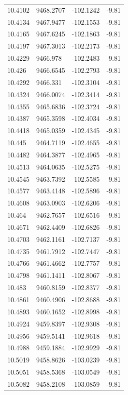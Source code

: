 \begin{table}[H]
\begin{tabular}{llll}
10.4102 & 9468.2707 & -102.1242 & -9.81 \\
10.4134 & 9467.9477 & -102.1553 & -9.81 \\
10.4165 & 9467.6245 & -102.1863 & -9.81 \\
10.4197 & 9467.3013 & -102.2173 & -9.81 \\
10.4229 & 9466.978 & -102.2483 & -9.81 \\
10.426 & 9466.6545 & -102.2793 & -9.81 \\
10.4292 & 9466.331 & -102.3104 & -9.81 \\
10.4324 & 9466.0074 & -102.3414 & -9.81 \\
10.4355 & 9465.6836 & -102.3724 & -9.81 \\
10.4387 & 9465.3598 & -102.4034 & -9.81 \\
10.4418 & 9465.0359 & -102.4345 & -9.81 \\
10.445 & 9464.7119 & -102.4655 & -9.81 \\
10.4482 & 9464.3877 & -102.4965 & -9.81 \\
10.4513 & 9464.0635 & -102.5275 & -9.81 \\
10.4545 & 9463.7392 & -102.5585 & -9.81 \\
10.4577 & 9463.4148 & -102.5896 & -9.81 \\
10.4608 & 9463.0903 & -102.6206 & -9.81 \\
10.464 & 9462.7657 & -102.6516 & -9.81 \\
10.4671 & 9462.4409 & -102.6826 & -9.81 \\
10.4703 & 9462.1161 & -102.7137 & -9.81 \\
10.4735 & 9461.7912 & -102.7447 & -9.81 \\
10.4766 & 9461.4662 & -102.7757 & -9.81 \\
10.4798 & 9461.1411 & -102.8067 & -9.81 \\
10.483 & 9460.8159 & -102.8377 & -9.81 \\
10.4861 & 9460.4906 & -102.8688 & -9.81 \\
10.4893 & 9460.1652 & -102.8998 & -9.81 \\
10.4924 & 9459.8397 & -102.9308 & -9.81 \\
10.4956 & 9459.5141 & -102.9618 & -9.81 \\
10.4988 & 9459.1884 & -102.9929 & -9.81 \\
10.5019 & 9458.8626 & -103.0239 & -9.81 \\
10.5051 & 9458.5368 & -103.0549 & -9.81 \\
10.5082 & 9458.2108 & -103.0859 & -9.81 \\

\end{tabular}
\end{table}
